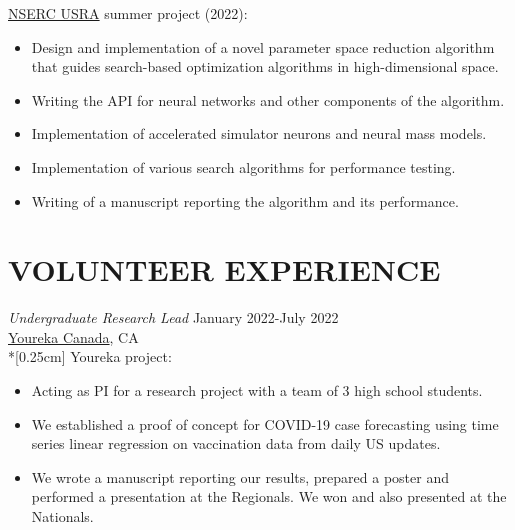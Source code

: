 \documentclass[margin, 10pt]{res} %
\begin{document}
\begin{resume}
\href{https://www.nserc-crsng.gc.ca/students-etudiants/ug-pc/usra-brpc_eng.asp}{NSERC USRA} summer project (2022):
\vspace*{0.15cm}
\begin{itemize} \itemsep -2pt %
	\item Design and implementation of a novel parameter space reduction algorithm that guides search-based optimization algorithms in high-dimensional space.
	\item Writing the API for neural networks and other components of the algorithm.
	\item Implementation of accelerated simulator neurons and neural mass models.
	\item Implementation of various search algorithms for performance testing.
	\item Writing of a manuscript reporting the algorithm and its performance.
\end{itemize}

\section{VOLUNTEER EXPERIENCE}

{\sl Undergraduate Research Lead} \hfill January 2022-July 2022\\ \href{https://yourekacanada.org/}{Youreka Canada}, CA\\*[0.25cm] 
Youreka project:
\vspace*{0.15cm}
\begin{itemize} \itemsep -2pt %
	\item Acting as PI for a research project with a team of 3 high school students.
	\item We established a proof of concept for COVID-19 case forecasting using time series linear regression on vaccination data from daily US updates.
	\item We wrote a manuscript reporting our results, prepared a poster and performed a presentation at the Regionals. We won and also presented at the Nationals.
\end{itemize}


\end{resume}
\end{document}
